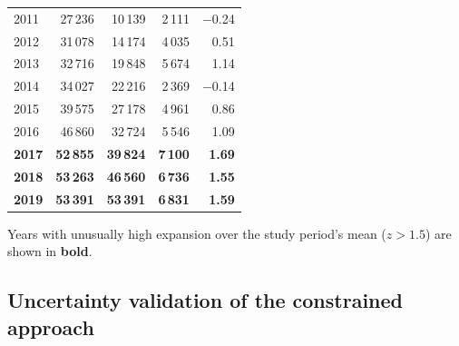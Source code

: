 \documentclass[]{interact}
\begin{document}
\begin{table}[H]
\begin{threeparttable}
\begin{tabular}{@{}lrrrr@{}}
      2011 & 27\,236 & 10\,139 & 2\,111 & $-$0.24 \\
      2012 & 31\,078 & 14\,174 & 4\,035 & \phantom{$-$}0.51 \\
      2013 & 32\,716 & 19\,848 & 5\,674 & \phantom{$-$}1.14 \\
      2014 & 34\,027 & 22\,216 & 2\,369 & $-$0.14 \\
      2015 & 39\,575 & 27\,178 & 4\,961 & \phantom{$-$}0.86 \\
      2016 & 46\,860 & 32\,724 & 5\,546 & \phantom{$-$}1.09 \\
      \textbf{2017} & \textbf{52\,855} & \textbf{39\,824} & \textbf{7\,100} & \textbf{\phantom{$-$}1.69} \\
      \textbf{2018} & \textbf{53\,263} & \textbf{46\,560} & \textbf{6\,736} & \textbf{\phantom{$-$}1.55} \\
      \textbf{2019} & \textbf{53\,391} & \textbf{53\,391} & \textbf{6\,831} & \textbf{\phantom{$-$}1.59} \\
      \bottomrule
    \end{tabular}
    \begin{tablenotes}[flushleft]
      \footnotesize
      \item[a] Years with unusually high expansion over the study period's mean ($z > 1.5$) are shown in \textbf{bold}.
    \end{tablenotes}
  \end{threeparttable}
\end{table}

\subsection{Uncertainty validation of the constrained approach}
\label{app:simulation}
\end{document}
